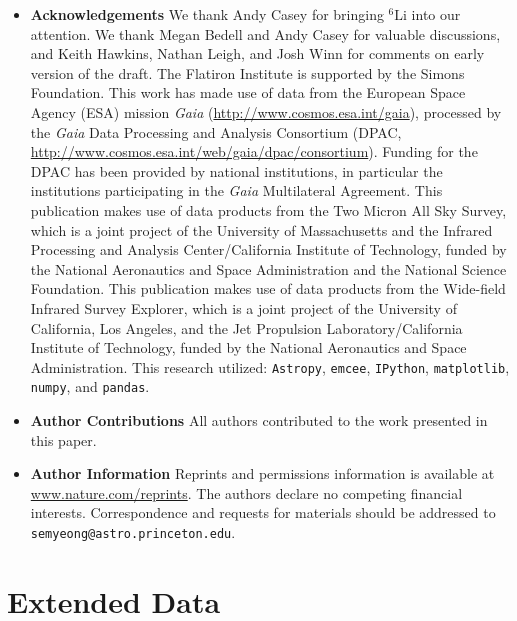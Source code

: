 \documentclass[12pt,letterpaper,margin=1in]{article}
\newcommand*\elem[1]{\ensuremath{\mathrm{#1}}}
\begin{document}
\begin{itemize}
  \item {\bf Acknowledgements}
    We thank Andy Casey for bringing $^{6}\elem{Li}$ into our attention.
    We thank Megan Bedell and Andy Casey for valuable discussions,
    and Keith Hawkins, Nathan Leigh, and Josh Winn for comments
    on early version of the draft.
    The Flatiron Institute is supported by the Simons Foundation.
    This work has made use of data from the European Space Agency (ESA) mission
    {\it Gaia} (\url{http://www.cosmos.esa.int/gaia}), processed by the {\it Gaia}
    Data Processing and Analysis Consortium (DPAC,
    \url{http://www.cosmos.esa.int/web/gaia/dpac/consortium}). Funding for the DPAC
    has been provided by national institutions, in particular the institutions
    participating in the {\it Gaia} Multilateral Agreement.
    This publication makes use of data products from the Two Micron All Sky Survey,
    which is a joint project of the University of Massachusetts and the Infrared
    Processing and Analysis Center/California Institute of Technology, funded by
    the National Aeronautics and Space Administration and the National Science
    Foundation.
    This publication makes use of data products from the Wide-field Infrared Survey
    Explorer, which is a joint project of the University of California, Los
    Angeles, and the Jet Propulsion Laboratory/California Institute of Technology,
    funded by the National Aeronautics and Space Administration.
    This research utilized:
    \texttt{Astropy}\cite{Astropy-Collaboration:2013},
    \texttt{emcee}\cite{2013PASP..125..306F},
    \texttt{IPython}\cite{Perez:2007},
    \texttt{matplotlib}\cite{Hunter:2007},
    \texttt{numpy}\cite{Van-der-Walt:2011},
    and \texttt{pandas}\cite{pandas}.

  \item {\bf Author Contributions} All authors contributed to the work presented in this paper.

  \item {\bf Author Information}
    Reprints and permissions information is available at \url{www.nature.com/reprints}.
    The authors declare no competing financial interests.
    Correspondence and requests for materials should be addressed to
    \texttt{semyeong@astro.princeton.edu}.
\end{itemize}




\section{Extended Data}
\end{document}
